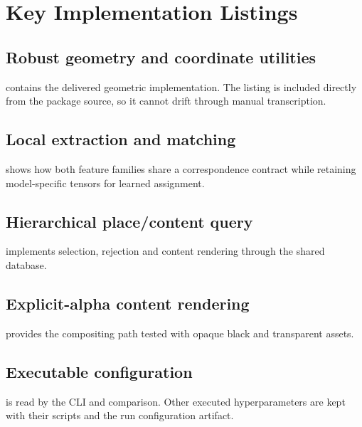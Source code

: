 \chapter{Key Implementation Listings}\label{app:code}
\section{Robust geometry and coordinate utilities}
 contains the delivered geometric implementation. The listing is included directly from the package source, so it cannot drift through manual transcription.


\section{Local extraction and matching}
 shows how both feature families share a correspondence contract while retaining model-specific tensors for learned assignment.


\section{Hierarchical place/content query}
 implements selection, rejection and content rendering through the shared database.


\section{Explicit-alpha content rendering}
 provides the compositing path tested with opaque black and transparent assets.


\section{Executable configuration}
 is read by the CLI and comparison. Other executed hyperparameters are kept with their scripts and the run configuration artifact.

